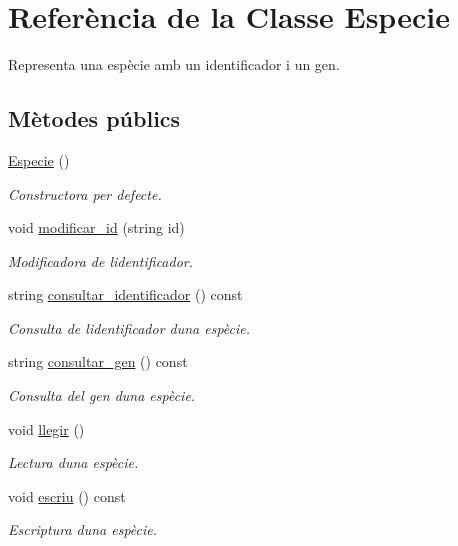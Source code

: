 \hypertarget{class_especie}{}\section{Referència de la Classe Especie}
\label{class_especie}


Representa una espècie amb un identificador i un gen.  


\subsection*{Mètodes públics}
\begin{DoxyCompactItemize}
\item 
\hyperlink{class_especie_a272c2488719cc9874b2f174906675b3d}{Especie} ()
\begin{DoxyCompactList}\small\item\em Constructora per defecte. \end{DoxyCompactList}\item 
void \hyperlink{class_especie_a28e9e87549c80a12d608328cf9d09e06}{modificar\+\_\+id} (string id)
\begin{DoxyCompactList}\small\item\em Modificadora de l\textquotesingle{}identificador. \end{DoxyCompactList}\item 
string \hyperlink{class_especie_a131d45ad81466f5368f52e5f0579d1d6}{consultar\+\_\+identificador} () const
\begin{DoxyCompactList}\small\item\em Consulta de l\textquotesingle{}identificador d\textquotesingle{}una espècie. \end{DoxyCompactList}\item 
string \hyperlink{class_especie_a850af2b59a21e2d801c59d76ba5c1a98}{consultar\+\_\+gen} () const
\begin{DoxyCompactList}\small\item\em Consulta del gen d\textquotesingle{}una espècie. \end{DoxyCompactList}\item 
void \hyperlink{class_especie_a7384add391d2684c4fb6bdf8a535fba3}{llegir} ()
\begin{DoxyCompactList}\small\item\em Lectura d\textquotesingle{}una espècie. \end{DoxyCompactList}\item 
void \hyperlink{class_especie_ae0db47c73d1ea93aebdae93b77ec468e}{escriu} () const
\begin{DoxyCompactList}\small\item\em Escriptura d\textquotesingle{}una espècie. \end{DoxyCompactList}\end{DoxyCompactItemize}


